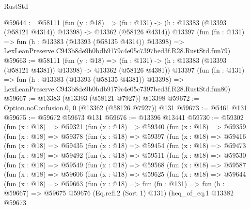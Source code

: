 \begin{lexlean}{RustStd}
\begin{coremodule}
@59644 := @58111
    (fun (y : @18) =>
    (fn : @131) -> (h : @13383 (@13393 (@58121 @4314)) @13398) -> @13362 (@58126 @4314))
    @13397
    (fun (fn : @131) =>
    fun (h : @13383 (@13393 (@58135 @4314)) @13398) =>
    LexLeanPreserve.C943b8de9b0bdb9179c4e05c7397bed3f.R28.RustStd.fun79)
@59663 := @58111
    (fun (y : @18) =>
    (fn : @131) -> (h : @13383 (@13393 (@58121 @4381)) @13398) -> @13362 (@58126 @4381))
    @13397
    (fun (fn : @131) =>
    fun (h : @13383 (@13393 (@58135 @4381)) @13398) =>
    LexLeanPreserve.C943b8de9b0bdb9179c4e05c7397bed3f.R28.RustStd.fun80)
@59667 := @13383 (@13393 (@58121 @7927)) @13398
@59672 := Option.noConfusion.{0, 0} (@13362 (@58126 @7927)) @131
@59673 := @5461 @131
@59675 := @59672 @59673 @131
@59676 := @13396 @13441
@59730 := @59302
    (fun (x : @18) =>
    @59321
      (fun (x : @18) =>
      @59340
        (fun (x : @18) =>
        @59359
          (fun (x : @18) =>
          @59378
            (fun (x : @18) =>
            @59397
              (fun (x : @18) =>
              @59416
                (fun (x : @18) =>
                @59435
                  (fun (x : @18) =>
                  @59454
                    (fun (x : @18) =>
                    @59473
                      (fun (x : @18) =>
                      @59492
                        (fun (x : @18) =>
                        @59511
                          (fun (x : @18) =>
                          @59530
                            (fun (x : @18) =>
                            @59549
                              (fun (x : @18) =>
                              @59568
                                (fun (x : @18) =>
                                @59587
                                  (fun (x : @18) =>
                                  @59606
                                    (fun (x : @18) =>
                                    @59625
                                      (fun (x : @18) =>
                                      @59644
                                        (fun (x : @18) =>
                                        @59663
                                          (fun (x : @18) =>
                                          fun (fn : @131) =>
                                          fun (h : @59667) =>
                                          @59675
                                            @59676
                                            (Eq.refl.{2} (Sort 1) @131)
                                            (heq_of_eq.{1}
                                              @13382
                                              @59673

\end{coremodule}
\end{lexlean}
